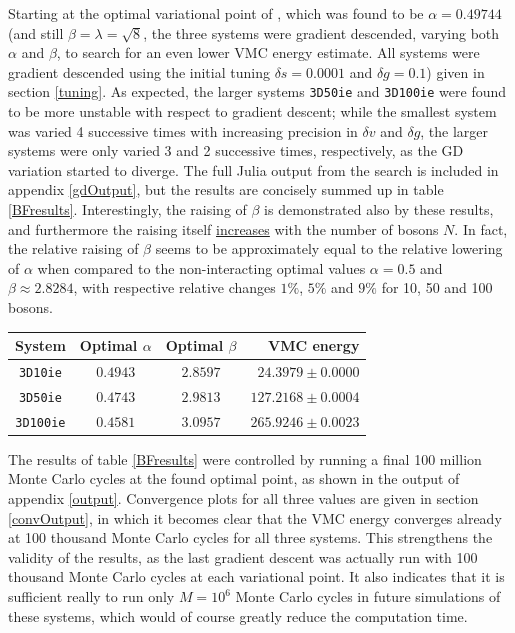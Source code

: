 \documentclass[a4paper,8pt]{article}
\begin{document}
\begin{multicols}{2}
Starting at the optimal variational point of \cite{SWL}, which was found to be ${\alpha = 0.49744}$ (and still ${\beta = \lambda = \sqrt{8}}$, the three systems were gradient descended, varying both $\alpha$ and $\beta$, to search for an even lower VMC energy estimate. All systems were gradient descended using the initial tuning ${\delta s = 0.0001}$ and $\delta g = 0.1$) given in section \ref{tuning}. As expected, the larger systems \texttt{3D50ie} and \texttt{3D100ie} were found to be more unstable with respect to gradient descent; while the smallest system was varied 4 successive times with increasing precision in $\delta v$ and $\delta g$, the larger systems were only varied 3 and 2 successive times, respectively, as the GD variation started to diverge. The full Julia output from the search is included in appendix \ref{gdOutput}, but the results are concisely summed up in table \ref{BFresults}. Interestingly, the raising of $\beta$ is demonstrated also by these results, and furthermore the raising itself \underline{increases} with the number of bosons $N$. In fact, the relative raising of $\beta$ seems to be approximately equal to the relative lowering of $\alpha$ when compared to the non-interacting optimal values ${\alpha = 0.5}$ and ${\beta \approx 2.8284}$, with respective relative changes $1\%$, $5\%$ and $9\%$ for 10, 50 and 100 bosons.

\begin{center}\small
{}
\label{BFresults}
\begin{tabular}{cccr}
	\hline\hline
	System & Optimal $\alpha$ & Optimal $\beta$ & VMC energy \\
	\hline
    \texttt{3D10ie} & $0.4943$ & $2.8597$ & $24.3979 \pm 0.0000$\\
    \texttt{3D50ie} & $0.4743$ & $2.9813$ & $127.2168 \pm 0.0004$\\
    \texttt{3D100ie} & $0.4581$ & $3.0957$ & $265.9246 \pm 0.0023$\\
    \hline\hline
\end{tabular}
\end{center}

The results of table \ref{BFresults} were controlled by running a final 100 million Monte Carlo cycles at the found optimal point, as shown in the output of appendix \ref{output}. Convergence plots for all three values are given in section \ref{convOutput}, in which it becomes clear that the VMC energy converges already at 100 thousand Monte Carlo cycles for all three systems. This strengthens the validity of the results, as the last gradient descent was actually run with 100 thousand Monte Carlo cycles at each variational point. It also indicates that it is sufficient really to run only $M = 10^6$ Monte Carlo cycles in future simulations of these systems, which would of course greatly reduce the computation time.


\end{multicols}
\end{document}
